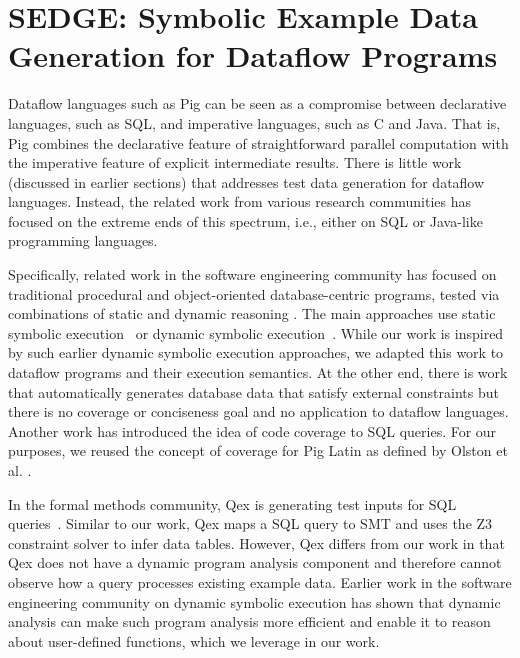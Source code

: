 \section{SEDGE: Symbolic Example Data Generation for Dataflow Programs}

Dataflow languages such as Pig can be seen as a compromise between
declarative languages, such as SQL, and imperative languages, such as C
and Java. That is, Pig combines the declarative feature of
straightforward parallel computation with the imperative feature of
explicit intermediate results. 
There is little work (discussed in earlier sections) that addresses
test data generation for dataflow languages. Instead, the
related work from various research communities has focused on the
extreme ends of this spectrum, i.e., either on SQL or Java-like
programming languages.

Specifically, related work in the software engineering community has
focused on traditional procedural and object-oriented database-centric
programs, tested via combinations of static and dynamic reasoning
\cite{DBLP:conf/tap/SmaragdakisC07}. The main approaches use static
symbolic execution~\cite{marcozzi12test} or dynamic symbolic
execution~\cite{emmi07dynamic,li10dynamic,pan11generating}.  While our
work is inspired by such earlier dynamic symbolic execution
approaches, we adapted this work to dataflow programs and their
execution semantics. At the other end, there is work that
automatically generates database data that satisfy external
constraints \cite{orm-ase07} but there is no coverage or conciseness
goal and no application to dataflow languages. Another work
\cite{tuya10full} has introduced the idea of code coverage to SQL
queries. For our purposes, we reused the concept of coverage for Pig
Latin as defined by Olston et al.
\cite{Olston:2009:GED:1559845.1559873}.


In the formal methods community, Qex is generating test inputs for SQL 
queries~\cite{veanes10qex}. Similar to our work, Qex maps a SQL
query to SMT and uses the Z3 constraint solver to infer data tables.
However, Qex differs from our work in that Qex does not have a dynamic 
program analysis component and therefore cannot observe how a query
processes existing example data. Earlier work in the software engineering
community on dynamic symbolic execution has shown that dynamic analysis
can make such program analysis more efficient and enable it to reason
about user-defined functions, which we leverage in our work.

